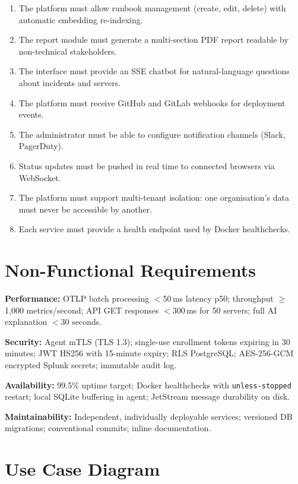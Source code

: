 \begin{enumerate}[label=\textbf{FR\arabic*}, leftmargin=2.2cm, itemsep=4pt]
  \item The platform must allow runbook management (create, edit, delete) with automatic embedding re-indexing.
  \item The report module must generate a multi-section PDF report readable by non-technical stakeholders.
  \item The interface must provide an SSE chatbot for natural-language questions about incidents and servers.
  \item The platform must receive GitHub and GitLab webhooks for deployment events.
  \item The administrator must be able to configure notification channels (Slack, PagerDuty).
  \item Status updates must be pushed in real time to connected browsers via WebSocket.
  \item The platform must support multi-tenant isolation: one organisation's data must never be accessible by another.
  \item Each service must provide a health endpoint used by Docker healthchecks.
\end{enumerate}

\section{Non-Functional Requirements}

\textbf{Performance:} OTLP batch processing $<$50\,ms latency p50; throughput
$\geq$1,000 metrics/second; API GET responses $<$300\,ms for 50 servers; full AI
explanation $<$30 seconds.

\textbf{Security:} Agent mTLS (TLS 1.3); single-use enrollment tokens expiring
in 30 minutes; JWT HS256 with 15-minute expiry; RLS PostgreSQL; AES-256-GCM
encrypted Splunk secrets; immutable audit log.

\textbf{Availability:} 99.5\% uptime target; Docker healthchecks with
\texttt{unless-stopped} restart; local SQLite buffering in agent; JetStream
message durability on disk.

\textbf{Maintainability:} Independent, individually deployable services;
versioned DB migrations; conventional commits; inline documentation.

\section{Use Case Diagram}

